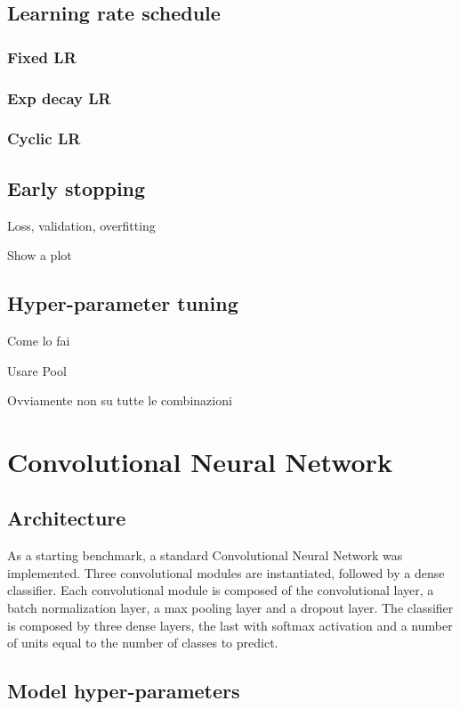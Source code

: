 \subsection{Learning rate schedule}

\subsubsection{Fixed LR}
\subsubsection{Exp decay LR}
\subsubsection{Cyclic LR}

\subsection{Early stopping}

Loss, validation, overfitting

Show a plot

\subsection{Hyper-parameter tuning}

Come lo fai

Usare Pool

Ovviamente non su tutte le combinazioni

\section{Convolutional Neural Network}
\label{sec:convolutional_arch}

\subsection{Architecture}

As a starting benchmark, a standard Convolutional Neural Network was implemented.
Three convolutional modules are instantiated, followed by a dense classifier.
Each convolutional module is composed of the convolutional layer, a batch
normalization layer, a max pooling layer and a dropout layer.
The classifier is composed by three dense layers, the last with softmax
activation and a number of units equal to the number of classes to predict.

\subsection{Model hyper-parameters}

